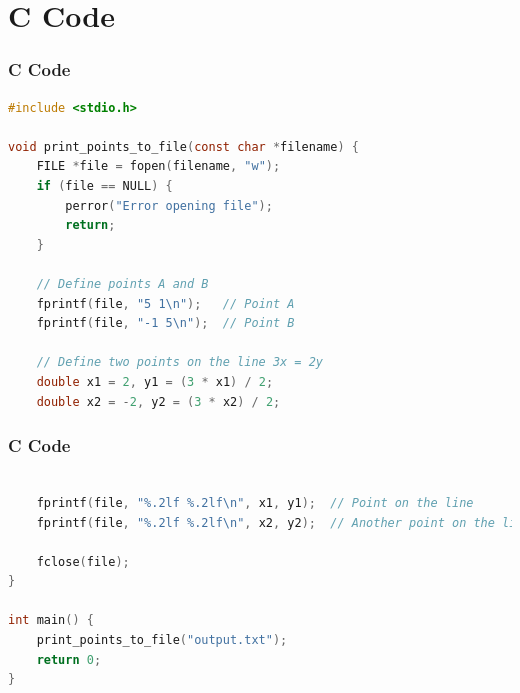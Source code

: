 \documentclass{beamer}
\theoremstyle{remark}
\numberwithin{equation}{section}
\begin{document}
\section{C Code}
\begin{frame}[fragile]
\frametitle{C Code}
\begin{lstlisting}[language=C]
#include <stdio.h>

void print_points_to_file(const char *filename) {
    FILE *file = fopen(filename, "w");
    if (file == NULL) {
        perror("Error opening file");
        return;
    }

    // Define points A and B
    fprintf(file, "5 1\n");   // Point A
    fprintf(file, "-1 5\n");  // Point B

    // Define two points on the line 3x = 2y
    double x1 = 2, y1 = (3 * x1) / 2;
    double x2 = -2, y2 = (3 * x2) / 2;
    \end{lstlisting}
\end{frame}
\begin{frame}[fragile]
\frametitle{C Code}
\begin{lstlisting}[language=C]

    fprintf(file, "%.2lf %.2lf\n", x1, y1);  // Point on the line
    fprintf(file, "%.2lf %.2lf\n", x2, y2);  // Another point on the line

    fclose(file);
}

int main() {
    print_points_to_file("output.txt");
    return 0;
}
\end{lstlisting}
\end{frame}
\end{document}
